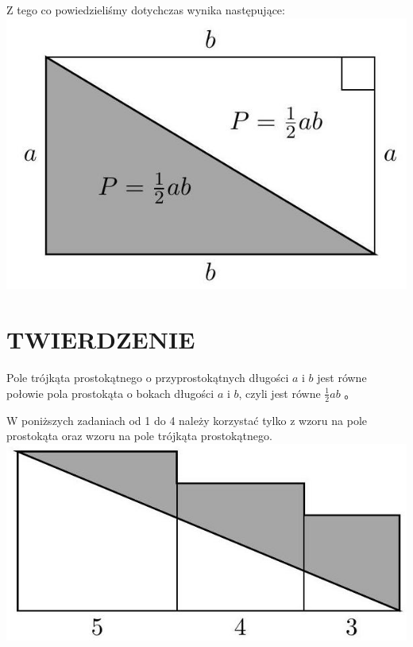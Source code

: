 \documentclass[10pt]{article}
\begin{document}
Z tego co powiedzieliśmy dotychczas wynika następujące:\\
\includegraphics[max width=\textwidth, center]{2024_11_21_71f62bd117d375398909g-029(3)}

\section*{TWIERDZENIE}
Pole trójkąta prostokątnego o przyprostokątnych długości \(a\) i \(b\) jest równe połowie pola prostokąta o bokach długości \(a\) i \(b\), czyli jest równe \(\frac{1}{2} a b\) 。

W poniższych zadaniach od 1 do 4 należy korzystać tylko z wzoru na pole prostokąta oraz wzoru na pole trójkąta prostokątnego.\\
\includegraphics[max width=\textwidth, center]{2024_11_21_71f62bd117d375398909g-029}
\end{document}
